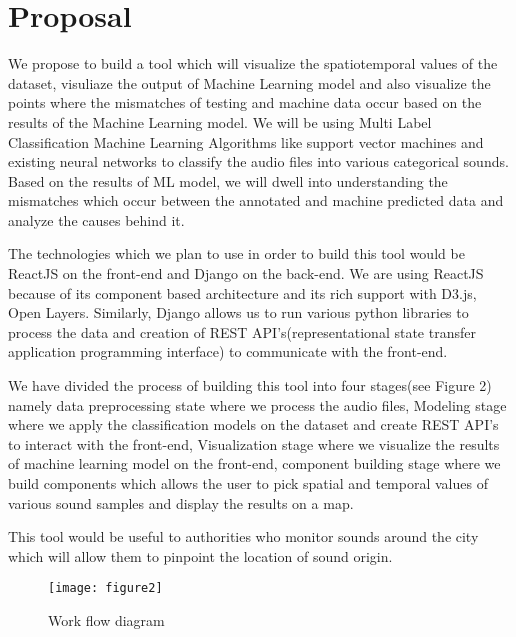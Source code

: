 	\section{Proposal}
    We propose to build a tool which will visualize the spatiotemporal values of the dataset, visuliaze the output of Machine Learning model and also visualize the points where the mismatches of testing and machine data occur based on the results of the Machine Learning model. We will be using Multi Label Classification Machine Learning Algorithms like support vector machines and existing neural networks to classify the audio files into various categorical sounds. Based on the results of ML model, we will dwell into understanding the mismatches which occur between the annotated and machine predicted data and analyze the causes behind it. 
    
    The technologies which we plan to use in order to build this tool would be ReactJS on the front-end and Django on the back-end. We are using ReactJS because of its component based architecture and its rich support with D3.js, Open Layers. Similarly, Django allows us to run various python libraries to process the data and creation of REST API's(representational state transfer application programming interface) to communicate with the front-end. 
   
   	We have divided the process of building this tool into four stages(see Figure 2) namely data preprocessing state where we process the audio files, Modeling stage where we apply the classification models on the dataset and create REST API's to interact with the front-end, Visualization stage where we visualize the results of machine learning model on the front-end, component building stage where we build components which allows the user to pick spatial and temporal values of various sound samples and display the results on a map.
   	
    This tool would be useful to authorities who monitor sounds around the city which will allow them to pinpoint the location of sound origin.
	\begin{figure}[h!]
	\texttt{[image: figure2]}
	\caption{ Work flow diagram}
	\end{figure}
	
	
